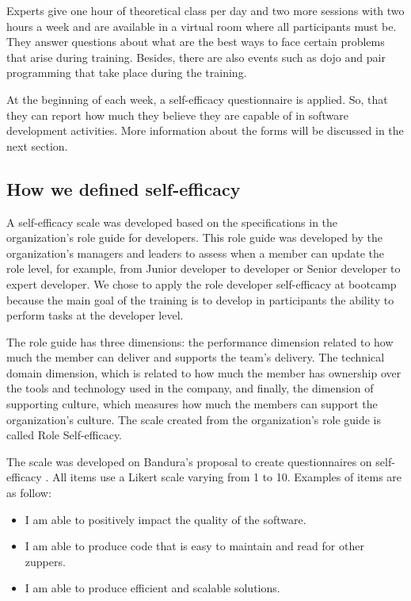 \documentclass{TheMartianReport}
\begin{document}
Experts give one hour of theoretical class per day and two more sessions with two hours a week and are available in a virtual room where all participants must be. They answer questions about what are the best ways to face certain problems that arise during training. Besides, there are also events such as dojo and pair programming that take place during the training.

At the beginning of each week, a self-efficacy questionnaire is applied. So, that they can report how much they believe they are capable of in software development activities. More information about the forms will be discussed in the next section.

\subsection{How we defined self-efficacy }

A  self-efficacy scale was developed based on the specifications in the organization's role guide for developers. This role guide was developed by the organization's managers and leaders to assess when a member can update the role level, for example, from Junior developer to developer or Senior developer to expert developer. We chose to apply the role developer self-efficacy at bootcamp because the main goal of the training is to develop in participants the ability to perform tasks at the developer level.

The role guide has three dimensions: the performance dimension related to how much the member can deliver and supports the team's delivery. The technical domain dimension, which is related to how much the member has ownership over the tools and technology used in the company, and finally, the dimension of supporting culture, which measures how much the members can support the organization's culture. The scale created from the organization's role guide is called Role Self-efficacy.

The scale was developed on Bandura's proposal to create questionnaires on self-efficacy \cite{bandura2010self}. All items use a Likert scale varying from 1 to 10. Examples of items are as follow:


\begin{itemize}
\item I am able to positively impact the quality of the software.
\item I am able to produce code that is easy to maintain and read for other zuppers.
\item I am able to produce efficient and scalable solutions.
\end{itemize}
\end{document}

